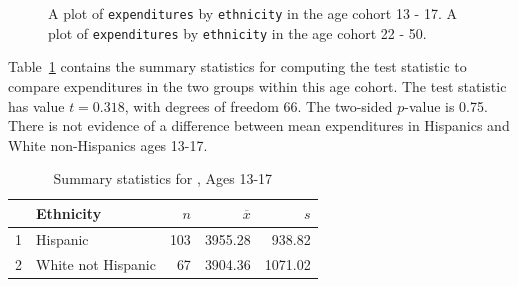 \begin{figure}[h!]
	\centering
	\caption{A plot of \texttt{expenditures} by \texttt{ethnicity} in the age cohort 13 - 17.   A plot of \texttt{expenditures} by \texttt{ethnicity} in the age cohort 22 - 50.}
	\label{ddsExpEthnicityAge}
\end{figure}

Table~\ref{ddsExpenditureSummaryByEthnicityAge13Table} contains the summary statistics for computing the test statistic to compare expenditures in the two groups within this age cohort.  The test statistic has value $t = 0.318$, with degrees of freedom 66. The two-sided $p$-value is 0.75. There is not evidence of a difference between mean expenditures in Hispanics and White non-Hispanics ages 13-17.

\begin{table}[h!]
  \centering
  \begin{tabular}{rlrrr}  \hline
& Ethnicity & $n$ & $\overline{x}$ & $s$ \\   \hline
1 & Hispanic & 103 & 3955.28 & 938.82 \\ 
2 & White not Hispanic &  67 & 3904.36 & 1071.02 \\    
\hline
\end{tabular}
\caption{Summary statistics for , Ages 13-17}
\label{ddsExpenditureSummaryByEthnicityAge13Table}
\end{table}

